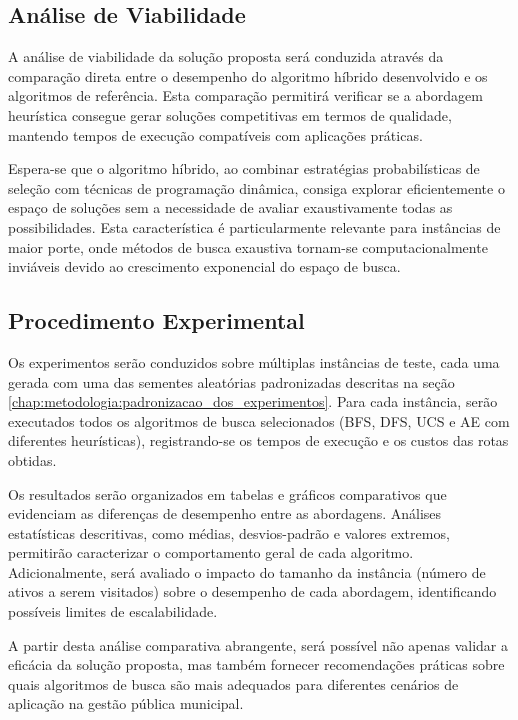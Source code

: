 \subsection{Análise de Viabilidade}

A análise de viabilidade da solução proposta será conduzida através da comparação direta 
entre o desempenho do algoritmo híbrido desenvolvido e os algoritmos de referência. Esta 
comparação permitirá verificar se a abordagem heurística consegue gerar soluções competitivas 
em termos de qualidade, mantendo tempos de execução compatíveis com aplicações práticas.

Espera-se que o algoritmo híbrido, ao combinar estratégias probabilísticas de seleção com 
técnicas de programação dinâmica, consiga explorar eficientemente o espaço de soluções sem 
a necessidade de avaliar exaustivamente todas as possibilidades. Esta característica é 
particularmente relevante para instâncias de maior porte, onde métodos de busca exaustiva 
tornam-se computacionalmente inviáveis devido ao crescimento exponencial do espaço de busca.

\subsection{Procedimento Experimental}

Os experimentos serão conduzidos sobre múltiplas instâncias de teste, cada uma gerada com 
uma das sementes aleatórias padronizadas descritas na seção \ref{chap:metodologia:padronizacao_dos_experimentos}. 
Para cada instância, serão executados todos os algoritmos de busca selecionados (\gls{BFS}, \gls{DFS}, \gls{UCS} 
e \gls{AE} com diferentes heurísticas), registrando-se os tempos de execução e os custos 
das rotas obtidas.

Os resultados serão organizados em tabelas e gráficos comparativos que evidenciam as 
diferenças de desempenho entre as abordagens. Análises estatísticas descritivas, como 
médias, desvios-padrão e valores extremos, permitirão caracterizar o comportamento geral 
de cada algoritmo. Adicionalmente, será avaliado o impacto do tamanho da instância 
(número de ativos a serem visitados) sobre o desempenho de cada abordagem, identificando 
possíveis limites de escalabilidade.

A partir desta análise comparativa abrangente, será possível não apenas validar a eficácia 
da solução proposta, mas também fornecer recomendações práticas sobre quais algoritmos de 
busca são mais adequados para diferentes cenários de aplicação na gestão pública municipal.

